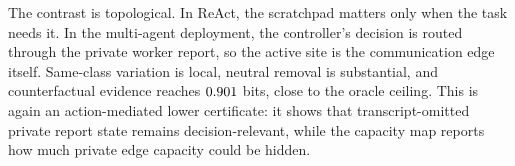   

  The contrast is topological. In ReAct, the scratchpad matters only when the
  task needs it. In the multi-agent deployment, the controller's decision is
  routed through the private worker report, so the active site is the
  communication edge itself. Same-class variation is local, neutral removal is
  substantial, and counterfactual evidence reaches
  $0.901$ bits, close to the oracle ceiling. This is
  again an action-mediated lower certificate: it shows that transcript-omitted
  private report state remains decision-relevant, while the capacity map reports
  how much private edge capacity could be hidden.
